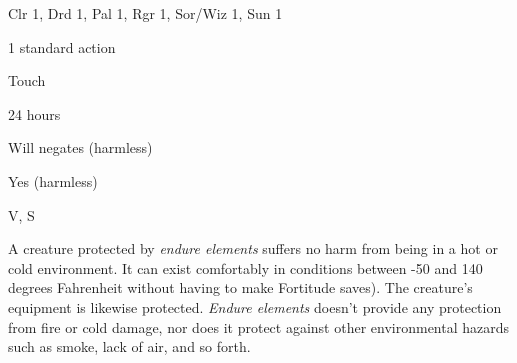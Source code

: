 
\begin{description*}
\item[Level:] Clr 1, Drd 1, Pal 1, Rgr 1, Sor/Wiz 1, Sun 1
\item[Casting Time:] 1 standard action
\item[Range:] Touch
\item[Duration:] 24 hours
\item[Saving Throw:] Will negates (harmless)
\item[Spell Resistance:] Yes (harmless)
\item[Components:] V, S
\end{description*}

A creature protected by \textit{endure elements} suffers no harm from being in
a hot or cold environment. It can exist comfortably in conditions between -50 and
140 degrees Fahrenheit without having to make Fortitude saves). The creature's
equipment is likewise protected.
\textit{Endure elements} doesn't provide any protection from fire or cold damage,
nor does it protect against other environmental hazards such as smoke, lack of
air, and so forth.